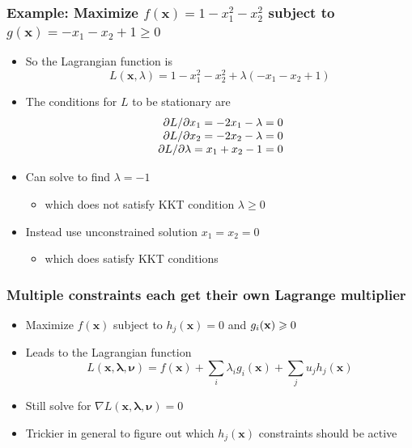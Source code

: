 \documentclass[12pt,notes,mathserif]{beamer}
\begin{document}
\begin{frame}[c]
	\frametitle{Example: Maximize $f(\mathbf{x})=1-x_1^2-x_2^2$ subject to $g(\mathbf{x})=-x_1-x_2+1\geqslant{}0$}
	\begin{itemize}
		\item So the Lagrangian function is
		      \[
			      L(\mathbf{x},\lambda)=1-x_1^2-x_2^2+\lambda(-x_1-x_2+1)
		      \]
		\item The conditions for $L$ to be stationary are
		      \[
			      \begin{array}{r@{~}l}
				      \partial L/\partial x_1=-2x_1-\lambda=0 \\
				      \partial L/\partial x_2=-2x_2-\lambda=0 \\
				      \partial L/\partial \lambda=x_1+x_2-1=0 \\
			      \end{array}
		      \]
		\item Can solve to find $\lambda=-1$
		      \begin{itemize}
			      \item which does not satisfy KKT condition $\lambda \geqslant{}0$
		      \end{itemize}
		\item Instead use unconstrained solution $x_1=x_2=0$
		      \begin{itemize}
			      \item which does satisfy KKT conditions
		      \end{itemize}
	\end{itemize}
\end{frame}


\begin{frame}[c]
	\frametitle{Multiple constraints each get their own Lagrange multiplier}
	\begin{itemize}
		\item Maximize $f(\mathbf{x})$ subject to $h_j(\mathbf{x})= 0$ and $g_i(\mathbf{x})\geqslant{}0$
		\item Leads to the Lagrangian function
		      \[
			      L(\mathbf{x,\lambda,\nu})=f(\mathbf{x})+\sum_i \lambda_ig_i(\mathbf{x})+\sum_ju_jh_j(\mathbf{x})
		      \]
		\item Still solve for $\nabla L(\mathbf{x,\lambda,\nu})= 0$
		\item Trickier in general to figure out which $h_j(\mathbf{x})$ constraints should be active
	\end{itemize}
\end{frame}
\end{document}
